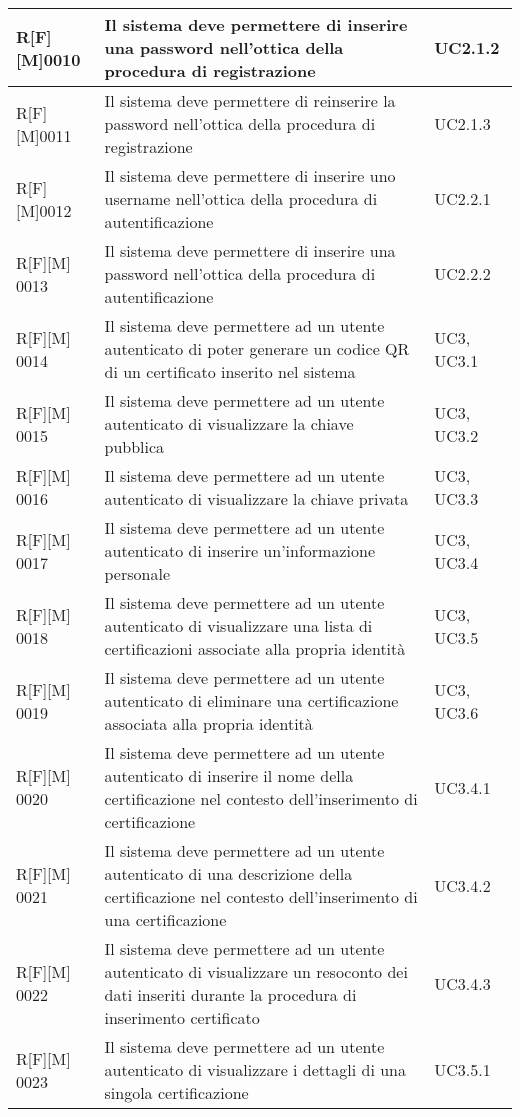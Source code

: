 \begin{center}
\begin{longtable}{|p{2cm}|p{9cm}|p{2cm}|}
\hline
R[F][M]0010    & Il sistema deve permettere di inserire una password nell’ottica della procedura di registrazione & UC2.1.2 \\
\hline
R[F][M]0011     & Il sistema deve permettere di reinserire la password nell’ottica della procedura di registrazione & UC2.1.3 \\
\hline
R[F][M]0012     & Il sistema deve permettere di inserire uno username nell’ottica della procedura di autentificazione & UC2.2.1 \\
\hline
R[F][M] 0013     & Il sistema deve permettere di inserire una password nell’ottica della procedura di autentificazione & UC2.2.2 \\
\hline
R[F][M] 0014     & Il sistema deve permettere ad un utente autenticato di poter generare un codice QR di un certificato inserito nel sistema & UC3, UC3.1 \\
\hline
R[F][M] 0015     & Il sistema deve permettere ad un utente autenticato di visualizzare la chiave pubblica & UC3, UC3.2 \\
\hline
R[F][M] 0016     & Il sistema deve permettere ad un utente autenticato di visualizzare la chiave privata & UC3, UC3.3 \\
\hline
R[F][M] 0017     & Il sistema deve permettere ad un utente autenticato di inserire un’informazione personale & UC3, UC3.4 \\
\hline
R[F][M] 0018     & Il sistema deve permettere ad un utente autenticato di visualizzare una lista di certificazioni associate alla propria identità & UC3, UC3.5 \\
\hline
R[F][M] 0019     & Il sistema deve permettere ad un utente autenticato di eliminare una certificazione associata alla propria identità & UC3, UC3.6 \\
\hline
R[F][M] 0020     & Il sistema deve permettere ad un utente autenticato di inserire il nome della certificazione nel contesto dell’inserimento di certificazione & UC3.4.1 \\
\hline
R[F][M] 0021     & Il sistema deve permettere ad un utente autenticato di una descrizione della certificazione nel contesto dell’inserimento di una certificazione & UC3.4.2 \\
\hline
R[F][M] 0022     & Il sistema deve permettere ad un utente autenticato di visualizzare un resoconto dei dati inseriti durante la procedura di inserimento certificato & UC3.4.3 \\
\hline
R[F][M] 0023     & Il sistema deve permettere ad un utente autenticato di visualizzare i dettagli di una singola certificazione & UC3.5.1 \\

\end{longtable}
\end{center}
